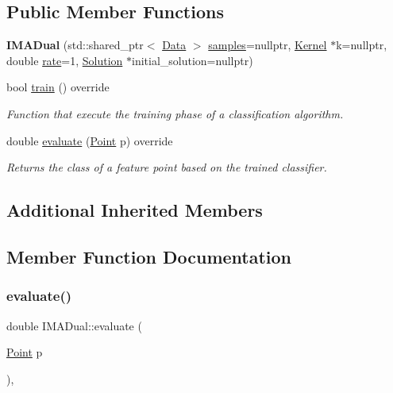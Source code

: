 \subsection*{Public Member Functions}
\begin{DoxyCompactItemize}
\item 
\mbox{\label{class_i_m_a_dual_a4d061aacf7ca5efe9d7f4a98be0fdbe2}} 
{\bfseries I\+M\+A\+Dual} (std\+::shared\+\_\+ptr$<$ \hyperlink{class_data}{Data} $>$ \hyperlink{class_classifier_aad6a4fcea8f44339d7a6302f530852ca}{samples}=nullptr, \hyperlink{class_kernel}{Kernel} $\ast$k=nullptr, double \hyperlink{class_classifier_af9867e5919742de1303dd971a9a1c19a}{rate}=1, \hyperlink{class_solution}{Solution} $\ast$initial\+\_\+solution=nullptr)
\item 
bool \hyperlink{class_i_m_a_dual_aad4b4f97645da661c954259e52c424b4}{train} () override
\begin{DoxyCompactList}\small\item\em Function that execute the training phase of a classification algorithm. \end{DoxyCompactList}\item 
double \hyperlink{class_i_m_a_dual_a6e8fe0bee8e37f64de229c3fdf2a20c3}{evaluate} (\hyperlink{class_point}{Point} p) override
\begin{DoxyCompactList}\small\item\em Returns the class of a feature point based on the trained classifier. \end{DoxyCompactList}\end{DoxyCompactItemize}
\subsection*{Additional Inherited Members}


\subsection{Member Function Documentation}
\mbox{\label{class_i_m_a_dual_a6e8fe0bee8e37f64de229c3fdf2a20c3}} 
\subsubsection{\texorpdfstring{evaluate()}{evaluate()}}
{\footnotesize\ttfamily double I\+M\+A\+Dual\+::evaluate (\begin{DoxyParamCaption}\item[{\hyperlink{class_point}{Point}}]{p }\end{DoxyParamCaption})\hspace{0.3cm}{\ttfamily [override]}, {\ttfamily [virtual]}}



